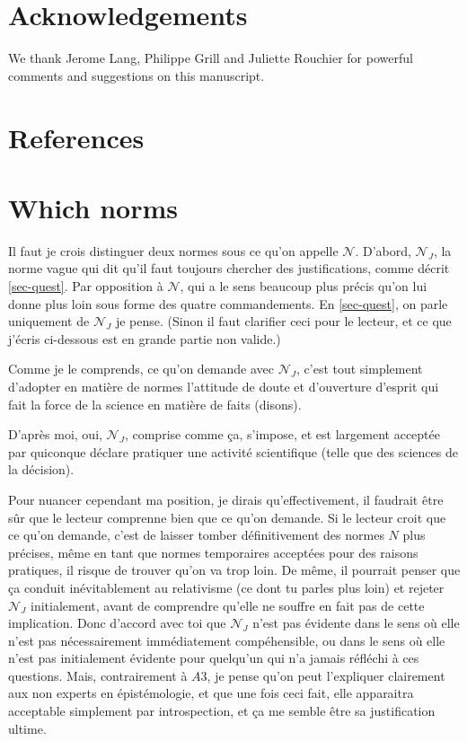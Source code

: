 \documentclass[preprint, french, english, 11pt, authoryear]{elsarticle}%
\newcommand{\adv}{\mathscr{N}}
\newcommand{\fadv}{\mathscr{N}_J}%
\begin{document}
\section*{Acknowledgements}
We thank Jerome Lang, Philippe Grill and Juliette Rouchier for powerful comments and suggestions on this manuscript.

\section*{References}



\renewcommand*{\appendixname}{}
\appendix

\section{Which norms}
\label{sec-whichnorms}

Il faut je crois distinguer deux normes sous ce qu’on appelle $\adv$. D’abord, $\fadv$, la norme vague qui dit qu’il faut toujours chercher des justifications, comme décrit \cref{sec-quest}. Par opposition à $\adv$, qui a le sens beaucoup plus précis qu’on lui donne plus loin sous forme des quatre commandements. En \cref{sec-quest}, on parle uniquement de $\fadv$ je pense. (Sinon il faut clarifier ceci pour le lecteur, et ce que j’écris ci-dessous est en grande partie non valide.)

Comme je le comprends, ce qu’on demande avec $\fadv$, c’est tout simplement d’adopter en matière de normes l’attitude de doute et d’ouverture d’esprit qui fait la force de la science en matière de \og{}faits\fg{} (disons).

D’après moi, oui, $\fadv$, comprise comme ça, s’impose, et est largement acceptée par quiconque déclare pratiquer une activité scientifique (telle que des sciences de la décision).

Pour nuancer cependant ma position, je dirais qu’effectivement, il faudrait être sûr que le lecteur comprenne bien que ce qu’on demande. Si le lecteur croit que ce qu’on demande, c’est de laisser tomber définitivement des normes $N$ plus précises, même en tant que normes temporaires acceptées pour des raisons pratiques, il risque de trouver qu’on va trop loin. De même, il pourrait penser que ça conduit inévitablement au relativisme (ce dont tu parles plus loin) et rejeter $\fadv$ initialement, avant de comprendre qu’elle ne souffre en fait pas de cette implication. Donc d’accord avec toi que $\fadv$ n’est pas évidente dans le sens où elle n’est pas nécessairement immédiatement compéhensible, ou dans le sens où elle n’est pas initialement évidente pour quelqu’un qui n’a jamais réfléchi à ces questions. Mais, contrairement à $A3$, je pense qu’on peut l’expliquer clairement aux non experts en épistémologie, et que une fois ceci fait, elle apparaitra acceptable simplement par introspection, et ça me semble être sa justification ultime.
\end{document}
